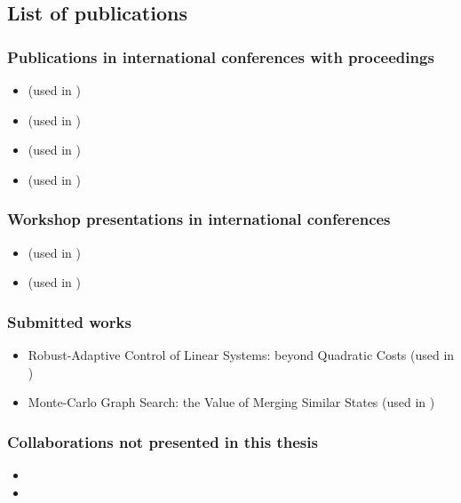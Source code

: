 \subsection*{List of publications}

\subsubsection*{Publications in international conferences with proceedings}

\begin{itemize}
	\item {} (used in )
	\item {} (used in )
	\item {} (used in )
	\item {} (used in )
\end{itemize}

\subsubsection*{Workshop presentations in international conferences}

\begin{itemize}
	\item {} (used in )
	\item {} (used in )
\end{itemize}

\subsubsection*{Submitted works}

\begin{itemize}
	\item Robust-Adaptive Control of Linear Systems: beyond Quadratic Costs (used in )
	\item Monte-Carlo Graph Search: the Value of Merging Similar States (used in )
\end{itemize}

\subsubsection*{Collaborations not presented in this thesis}

\begin{itemize}
	\item {}
	\item {}
\end{itemize}